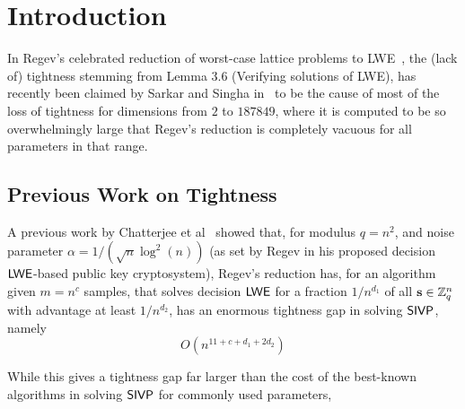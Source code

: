 \section{Introduction}

In Regev's celebrated reduction of worst-case lattice problems to
LWE~\cite{DBLP:journals/jacm/Regev09}, the (lack of) tightness
stemming from Lemma 3.6 (Verifying solutions
of LWE), has recently been claimed by Sarkar and Singha
in~\cite{cryptoeprint:2019:728} to be the cause of most of the loss of
tightness for dimensions from $2$ to $187849$, where it is computed to
be so overwhelmingly large that Regev's reduction is completely vacuous for all
parameters in that range. 

\subsection{Previous Work on Tightness}
\label{sec:prev-work}
A previous work by Chatterjee et
al~\cite{DBLP:conf/mycrypt/ChatterjeeKMS16} showed that, for
modulus $q=n^2$, and noise parameter $\alpha=1/(\sqrt{n}\log^{2}(n))$
(as set by Regev in his proposed decision $\mathsf{LWE}$-based public key cryptosystem),
Regev's reduction has, for an algorithm given $m=n^{c}$ samples, that
solves decision $\mathsf{LWE}$ for a fraction $1/n^{d_1}$ of all $\mathbf{s} \in
\mathbb{Z}_q^{n}$ with advantage at least $1/n^{d_2}$, has an enormous
tightness gap in solving $\mathsf{SIVP}$, namely 
\[O(n^{11+c+d_1+2d_2})\]

While this gives a tightness gap far larger than the cost of the
best-known algorithms in solving $\mathsf{SIVP}$ for commonly used
parameters,  


